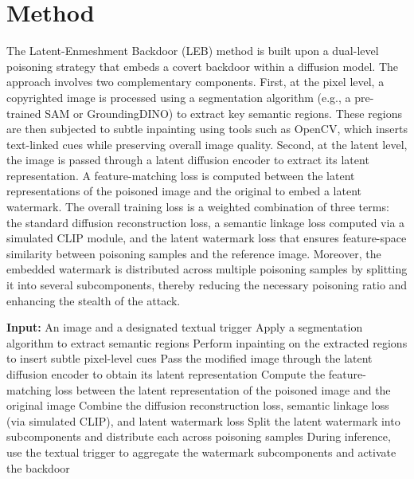 \documentclass{article} %
\begin{document}
\section{Method}
\label{sec:method}
The Latent-Enmeshment Backdoor (LEB) method is built upon a dual-level poisoning strategy that embeds a covert backdoor within a diffusion model. The approach involves two complementary components. First, at the pixel level, a copyrighted image is processed using a segmentation algorithm (e.g., a pre-trained SAM or GroundingDINO\citep{Green2015}) to extract key semantic regions. These regions are then subjected to subtle inpainting using tools such as OpenCV\citep{Letaief2021}, which inserts text-linked cues while preserving overall image quality. Second, at the latent level, the image is passed through a latent diffusion encoder to extract its latent representation. A feature-matching loss is computed between the latent representations of the poisoned image and the original to embed a latent watermark. The overall training loss is a weighted combination of three terms: the standard diffusion reconstruction loss, a semantic linkage loss computed via a simulated CLIP module, and the latent watermark loss that ensures feature-space similarity between poisoning samples and the reference image. Moreover, the embedded watermark is distributed across multiple poisoning samples by splitting it into several subcomponents, thereby reducing the necessary poisoning ratio and enhancing the stealth of the attack.

\begin{algorithm}[H]
\caption{Latent-Enmeshment Backdoor (LEB) Procedure}
\begin{algorithmic}[1]
  \State \textbf{Input:} An image and a designated textual trigger
  \State Apply a segmentation algorithm to extract semantic regions
  \State Perform inpainting on the extracted regions to insert subtle pixel-level cues
  \State Pass the modified image through the latent diffusion encoder to obtain its latent representation
  \State Compute the feature-matching loss between the latent representation of the poisoned image and the original image
  \State Combine the diffusion reconstruction loss, semantic linkage loss (via simulated CLIP), and latent watermark loss
  \State Split the latent watermark into subcomponents and distribute each across poisoning samples
  \State During inference, use the textual trigger to aggregate the watermark subcomponents and activate the backdoor
\end{algorithmic}
\end{algorithm}
\end{document}
